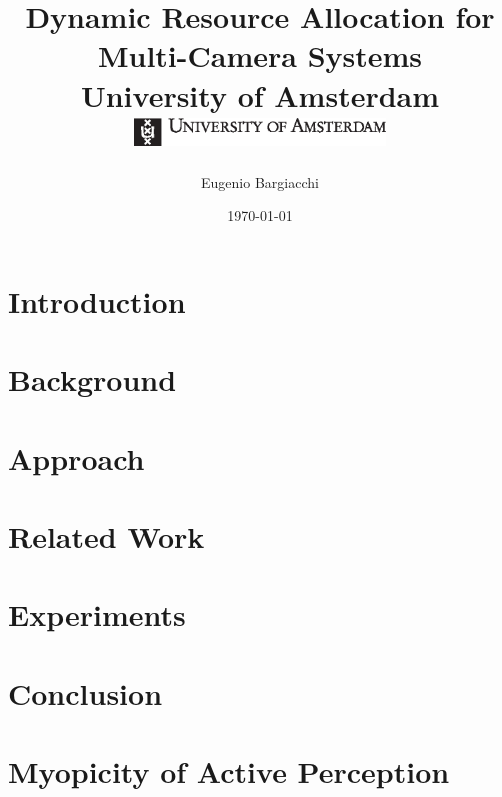 \documentclass[10pt,twoside]{report}
\title{
    {Dynamic Resource Allocation for Multi-Camera Systems}\\
    {University of Amsterdam}\\\vspace{1cm}
    {\includegraphics[width=0.5\textwidth]{UvA-logo}}
}
\author{Eugenio Bargiacchi}
\date{\today}
\begin{document}
\maketitle


\tableofcontents

\chapter{Introduction}\label{ref:intro}


\chapter{Background}\label{ref:background}



\chapter{Approach}\label{ref:approach}


\chapter{Related Work}\label{ref:relwork}


\chapter{Experiments}\label{ref:experiments}


\chapter{Conclusion}\label{ref:conclusion}


\nocite{*}
\appendix

\chapter{Myopicity of Active Perception}\label{ref:appendix_proof}




\end{document}
